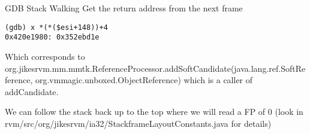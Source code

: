 \begin{section}{GDB Stack Walking}
Get the return address from the next frame

\begin{lstlisting}[breaklines=true,breakatwhitespace=false]
(gdb) x *(*($esi+148))+4
0x420e1980:	0x352ebd1e
\end{lstlisting}

Which corresponds to org.jikes\-rvm.mm.mmtk.Reference\-Processor.add\-Soft\-Can\-di\-da\-te(java.\-lang\-.ref.\-Soft\-Reference, org.vmmagic.unboxed.Object\-Reference) which is a caller of addCandidate.

We can follow the stack back up to the top where we will read a FP of 0 (look in rvm/src/org/jikesrvm/ia32/StackframeLayoutConstants.java for details)


\end{section}